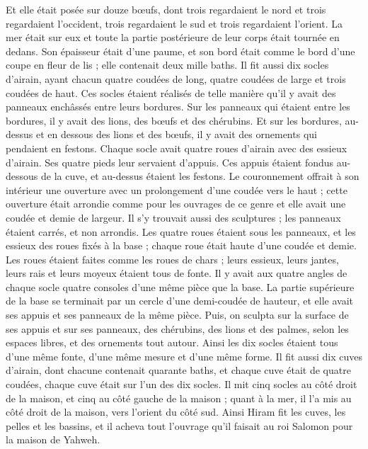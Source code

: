 \begin{multicols}{2}
Et elle était posée sur douze bœufs, dont trois regardaient le nord et trois regardaient l'occident, trois regardaient le sud et trois regardaient l'orient. La mer était sur eux et toute la partie postérieure de leur corps était tournée en dedans.
Son épaisseur était d'une paume, et son bord était comme le bord d'une coupe en fleur de lis ; elle contenait deux mille baths.
Il fit aussi dix socles d'airain, ayant chacun quatre coudées de long, quatre coudées de large et trois coudées de haut.
Ces socles étaient réalisés de telle manière qu'il y avait des panneaux enchâssés entre leurs bordures.
Sur les panneaux qui étaient entre les bordures, il y avait des lions, des bœufs et des chérubins. Et sur les bordures, au-dessus et en dessous des lions et des bœufs, il y avait des ornements qui pendaient en festons.
Chaque socle avait quatre roues d'airain avec des essieux d'airain. Ses quatre pieds leur servaient d’appuis. Ces appuis étaient fondus au-dessous de la cuve, et au-dessus étaient les festons.
Le couronnement offrait à son intérieur une ouverture avec un prolongement d'une coudée vers le haut ; cette ouverture était arrondie comme pour les ouvrages de ce genre et elle avait une coudée et demie de largeur. Il s’y trouvait aussi des sculptures ; les panneaux étaient carrés, et non arrondis.
Les quatre roues étaient sous les panneaux, et les essieux des roues fixés à la base ; chaque roue était haute d'une coudée et demie.
Les roues étaient faites comme les roues de chars ; leurs essieux, leurs jantes, leurs rais et leurs moyeux étaient tous de fonte.
Il y avait aux quatre angles de chaque socle quatre consoles d’une même pièce que la base.
La partie supérieure de la base se terminait par un cercle d’une demi-coudée de hauteur, et elle avait ses appuis et ses panneaux de la même pièce.
Puis, on sculpta sur la surface de ses appuis et sur ses panneaux, des chérubins, des lions et des palmes, selon les espaces libres, et des ornements tout autour.
Ainsi les dix socles étaient tous d’une même fonte, d’une même mesure et d’une même forme.
Il fit aussi dix cuves d'airain, dont chacune contenait quarante baths, et chaque cuve était de quatre coudées, chaque cuve était sur l’un des dix socles.
Il mit cinq socles au côté droit de la maison, et cinq au côté gauche de la maison ; quant à la mer, il l’a mis au côté droit de la maison, vers l'orient du côté sud.
Ainsi Hiram fit les cuves, les pelles et les bassins, et il acheva tout l'ouvrage qu'il faisait au roi Salomon pour la maison de Yahweh.

\end{multicols}

